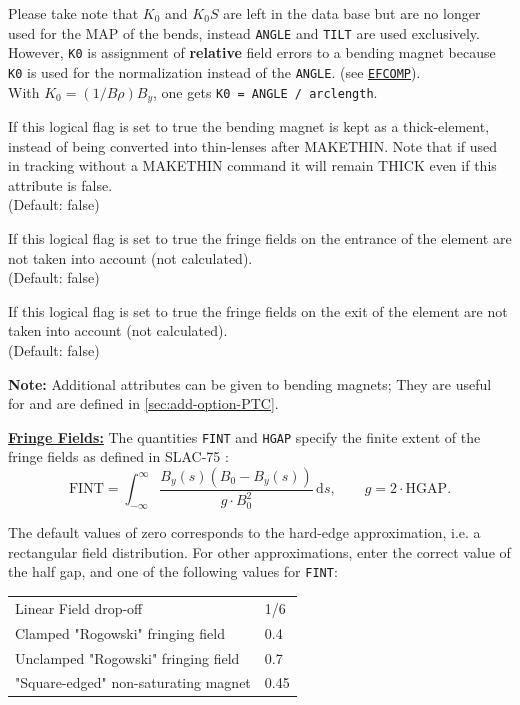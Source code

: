 \begin{madlist}
    Please take note that $K_0$ and $K_0S$ are left in the
   data base but are no longer used for the MAP of the bends,
   instead \texttt{ANGLE} and \texttt{TILT} are used exclusively. \\
   However, \texttt{K0} is assignment of \textbf{relative} field errors to a bending magnet because
   \texttt{K0} is used for the normalization instead of the
   \texttt{ANGLE}. (see \hyperref[sec:efcomp]{\texttt{EFCOMP}}).\\
   With $K_0 = (1 / B \rho) B_y$, one gets \texttt{K0 = ANGLE / arclength}.


    If this logical flag is set to true the bending
   magnet is kept as a thick-element, instead of being
   converted into thin-lenses after MAKETHIN. Note that
   if used in tracking without a MAKETHIN command it will
   remain THICK even if this attribute is false.  \\
   (Default: false)

    If this logical flag is set to true the fringe fields on the entrance of the element are not taken into account (not calculated). \\
   (Default: false)

    If this logical flag is set to true the fringe fields on the exit of the element are not taken into account (not calculated). \\
   (Default: false)
\end{madlist}

\textbf{Note:} Additional attributes can be given to bending magnets; They
are useful for \ptc and are defined in \ref{sec:add-option-PTC}.

\vskip 5mm
\textbf{\underline{Fringe Fields:}}
\vskip 3mm
The quantities \texttt{FINT} and \texttt{HGAP} specify the finite extent
of the fringe fields as defined in SLAC-75 \cite{slac75}:
\begin{equation}
\mathrm{FINT}=\int_{-\infty}^\infty \frac{B_y(s)(B_0-B_y(s))}{g \cdot
  B_0^2}\,\mathrm{d}s ,\quad\quad g=2\cdot \mathrm{HGAP}.
\end{equation}

The default values of zero corresponds to the hard-edge approximation,
i.e. a rectangular field distribution. For other approximations, enter
the correct value of the half gap, and one of the following values for
\texttt{FINT}:

\begin{center}
  \begin{tabular}{l l}
    Linear Field drop-off                   &  1/6 \\
    Clamped "Rogowski" fringing field       &  0.4 \\
    Unclamped "Rogowski" fringing field     &  0.7 \\
    "Square-edged" non-saturating magnet    &  0.45
  \end{tabular}
\end{center}


